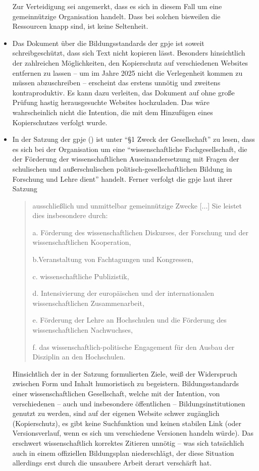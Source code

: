 \begin{itemize}
    Zur Verteidigung sei angemerkt, dass es sich in diesem Fall um eine gemeinnützige Organisation handelt. Dass bei solchen bisweilen die Ressourcen knapp sind, ist keine Seltenheit.  
    
    \item Das Dokument über die Bildungsstandards der \gls{gpje} ist soweit schreibgeschützt, dass sich Text nicht kopieren lässt. Besonders hinsichtlich der zahlreichen Möglichkeiten, den Kopierschutz auf verschiedenen Websites entfernen zu lassen -- um im Jahre 2025 nicht die Verlegenheit kommen zu müssen abzuschreiben -- erscheint das erstens unnötig und zweitens kontraproduktiv. Es kann dazu verleiten, das Dokument auf ohne große Prüfung hastig herausgesuchte Websites hochzuladen. Das wäre wahrscheinlich nicht die Intention, die mit dem Hinzufügen eines Kopierschutzes verfolgt wurde.
    
    \item In der Satzung der \gls{gpje} (\citeyear[]{gpje.satzung}) ist unter \enquote{\S 1 Zweck der Gesellschaft} zu lesen, dass es sich bei der Organisation um eine \enquote{wissenschaftliche Fachgesellschaft, die der Förderung der wissenschaftlichen Auseinandersetzung mit Fragen der schulischen und außerschulischen politisch-gesellschaftlichen Bildung in Forschung und Lehre dient} handelt.
    Ferner verfolgt die \gls{gpje} laut ihrer Satzung \blockquote{ausschließlich und unmittelbar gemeinnützige Zwecke [...] Sie leistet dies insbesondere durch:
    
    a. Förderung des wissenschaftlichen Diskurses, der Forschung und der wissenschaftlichen Kooperation,
    
    b.Veranstaltung von Fachtagungen und Kongressen,
    
    c. wissenschaftliche Publizistik,
    
    d. Intensivierung der europäischen und der internationalen wissenschaftlichen Zusammenarbeit,
    
    e. Förderung der Lehre an Hochschulen und die Förderung des wissenschaftlichen Nachwuchses,
    
    f. das wissenschaftlich-politische Engagement für den Ausbau der Disziplin an den Hochschulen.}

    Hinsichtlich der in der Satzung formulierten Ziele, weiß der Widerspruch zwischen Form und Inhalt humoristisch zu begeistern. Bildungsstandards einer wissenschaftlichen Gesellschaft, welche mit der Intention, von verschiedenen -- auch und insbesondere öffentlichen -- Bildungsinstitutionen genutzt zu werden, sind auf der eigenen Website schwer zugänglich (Kopierschutz), es gibt keine Suchfunktion und keinen stabilen Link (oder Versionsverlauf, wenn es sich um verschiedene Versionen handeln würde). Das erschwert wissenschaftlich korrektes Zitieren unnötig -- was sich tatsächlich auch in einem offiziellen Bildungsplan \autocite[][9]{bplan} niederschlägt, der diese Situation allerdings erst durch die unsaubere Arbeit derart verschärft hat. 
    

\end{itemize}
